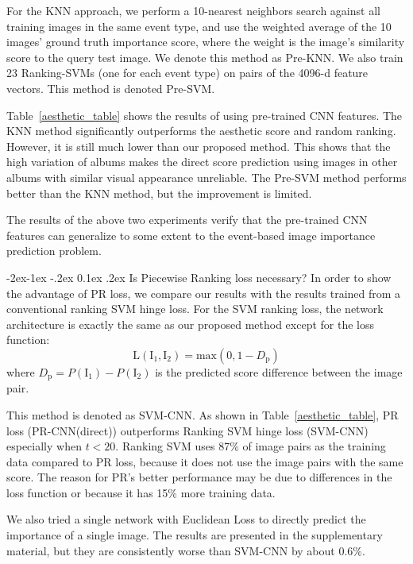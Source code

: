 \documentclass[10pt,twocolumn,letterpaper]{article}
\makeatletter
\renewcommand\subsubsection{\@startsection{subsubsection}{3}{\z@}%
                {-2ex\@plus -1ex \@minus -.2ex}%
                {0.1ex \@plus .2ex}%
                {\normalfont\normalsize\bfseries}}
\makeatother
\begin{document}
For the KNN approach, we perform a 10-nearest neighbors search against all training images in the same event type, and use the weighted average of the 10 images' ground truth importance score, where the weight is the image's similarity score to the query test image. We denote this method as Pre-KNN. We also train 23 Ranking-SVMs (one for each event type) on pairs of the 4096-d feature vectors. This method is denoted Pre-SVM.

Table~\ref{aesthetic_table} shows the results of using pre-trained CNN features. The KNN method significantly outperforms the aesthetic score and random ranking. However, it is still much lower than our proposed method. This shows that the high variation of albums makes the direct score prediction using images in other albums with similar visual appearance unreliable. The Pre-SVM method performs better than the KNN method, but the improvement is limited. 

The results of the above two experiments verify that the pre-trained CNN features can generalize to some extent to the event-based image importance prediction problem.

\subsubsection{Is Piecewise Ranking loss necessary?}
In order to show the advantage of PR loss, we compare our results with the results trained from a conventional ranking SVM hinge loss. For the SVM ranking loss, the network architecture is exactly the same as our proposed method except for the loss function:
\begin{equation} 
\text{L}(\text{I}_{1}, \text{I}_{2}) = \text{max}(0, 1-D_\text{p}) 
\end{equation}
where $D_\text{p} = P(\text{I}_{1})-P(\text{I}_{2})$ is the predicted score difference between the image pair.

This method is denoted as SVM-CNN. As shown in Table~\ref{aesthetic_table}, PR loss (PR-CNN(direct)) outperforms Ranking SVM hinge loss (SVM-CNN) especially when $t < 20$. Ranking SVM uses 87\% of image pairs as the training data compared to PR loss, because it does not use the image pairs with the same score. The reason for PR's better performance may be due to differences in the loss function or because  it has 15\% more training data.

We also tried a single network with Euclidean Loss to directly predict the importance of a single image. The results are presented in the supplementary material, but they are consistently worse than SVM-CNN by about 0.6\%.
\end{document}
